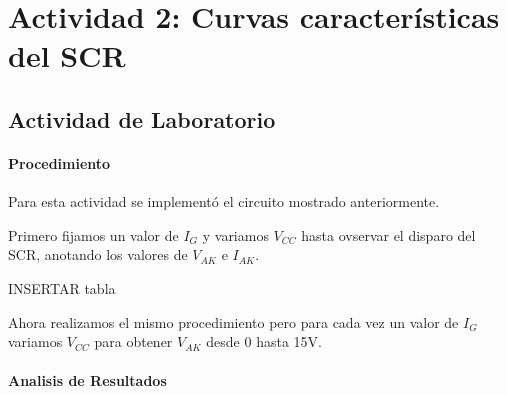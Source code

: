 \newpage

\section{Actividad 2: Curvas características del SCR}

\subsection{Actividad de Laboratorio}

\paragraph{Procedimiento}

Para esta actividad se implementó el circuito mostrado anteriormente.

Primero fijamos un valor de $I_G$ y variamos $V_{CC}$ hasta ovservar el disparo del SCR, anotando los valores de $V_{AK}$ e $I_{AK}$.

INSERTAR tabla

Ahora realizamos el mismo procedimiento pero para cada vez un valor de $I_G$ variamos $V_{CC}$ para obtener $V_{AK}$ desde 0 hasta 15V.

\paragraph{Analisis de Resultados}

